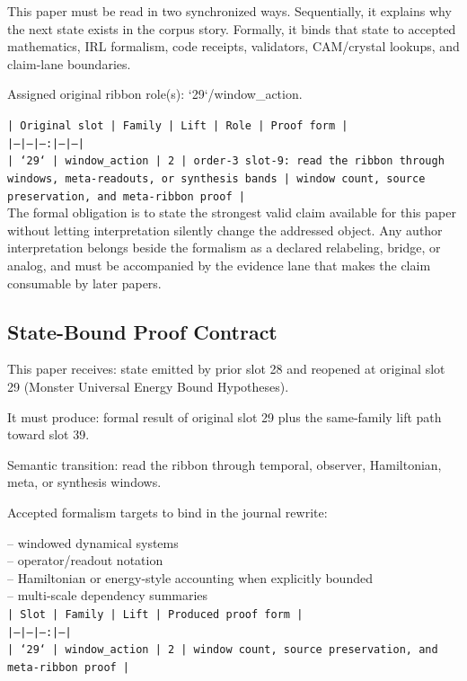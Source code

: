 \documentclass[11pt]{article}
\begin{document}
This paper must be read in two synchronized ways. Sequentially, it explains why
the next state exists in the corpus story. Formally, it binds that state to
accepted mathematics, IRL formalism, code receipts, validators, CAM/crystal
lookups, and claim-lane boundaries.

Assigned original ribbon role(s): `29`/window\_action.

\noindent\texttt{| Original slot | Family | Lift | Role | Proof form |}\\
\noindent\texttt{|---|---|---:|---|---|}\\
\noindent\texttt{| `29` | window\_action | 2 | order-3 slot-9: read the ribbon through windows, meta-readouts, or synthesis bands | window count, source preservation, and meta-ribbon proof |}\\

The formal obligation is to state the strongest valid claim available for this
paper without letting interpretation silently change the addressed object. Any
author interpretation belongs beside the formalism as a declared relabeling,
bridge, or analog, and must be accompanied by the evidence lane that makes the
claim consumable by later papers.

\subsection*{State-Bound Proof Contract}

This paper receives: state emitted by prior slot 28 and reopened at original slot 29 (Monster Universal Energy Bound Hypotheses).

It must produce: formal result of original slot 29 plus the same-family lift path toward slot 39.

Semantic transition: read the ribbon through temporal, observer, Hamiltonian, meta, or synthesis windows.

Accepted formalism targets to bind in the journal rewrite:

\noindent{}-- windowed dynamical systems\\
\noindent{}-- operator/readout notation\\
\noindent{}-- Hamiltonian or energy-style accounting when explicitly bounded\\
\noindent{}-- multi-scale dependency summaries\\

\noindent\texttt{| Slot | Family | Lift | Produced proof form |}\\
\noindent\texttt{|---|---|---:|---|}\\
\noindent\texttt{| `29` | window\_action | 2 | window count, source preservation, and meta-ribbon proof |}\\
\end{document}
